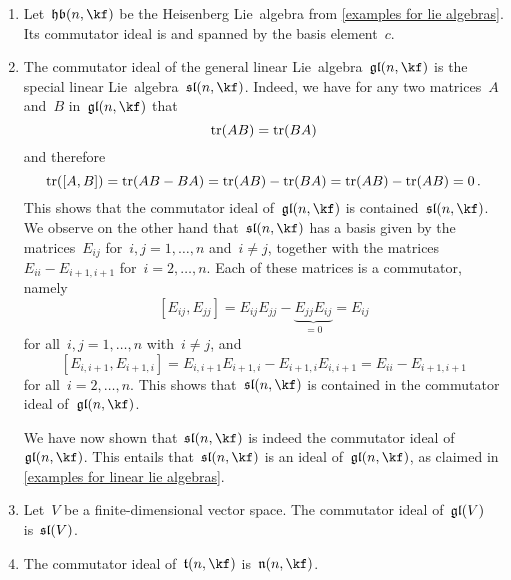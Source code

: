 \begin{example}
	\label{examples of commutator ideals}
	\leavevmode
	\begin{enumerate}
		\item
			Let~$\heisenberglie(n, \kf)$ be the Heisenberg Lie~algebra from \cref{examples for lie algebras}.
			Its commutator ideal is {\onedimensional} and spanned by the basis element~$c$.
		\item
			The commutator ideal of the general linear Lie~algebra~$\gllie(n, \kf)$ is the special linear Lie~algebra~$\sllie(n, \kf)$.
			Indeed, we have for any two matrices~$A$ and~$B$ in~$\gllie(n, \kf)$ that
			\[
				\operatorname{tr}(AB) = \operatorname{tr}(BA)
			\]
			and therefore
			\[
					\operatorname{tr}( [A,B] )
				= \operatorname{tr}(AB-BA)
				= \operatorname{tr}(AB) - \operatorname{tr}(BA)
				= \operatorname{tr}(AB) - \operatorname{tr}(AB)
				= 0  \,.
			\]
			This shows that the commutator ideal of~$\gllie(n, \kf)$ is contained~$\sllie(n, \kf)$.
			We observe on the other hand that~$\sllie(n, \kf)$ has a basis given by the matrices~$E_{ij}$ for~$i,j = 1, \dotsc, n$ and~$i \neq j$, together with the matrices~$E_{ii} - E_{i+1,i+1}$ for~$i = 2, \dotsc, n$.
			Each of these matrices is a commutator, namely
			\[
				[E_{ij}, E_{jj}]
				=
				E_{ij} E_{jj} - \underbrace{ E_{jj} E_{ij} }_{=0}
				=
				E_{ij}
			\]
			for all~$i, j = 1, \dotsc, n$ with~$i \neq j$, and
			\[
				[E_{i,i+1}, E_{i+1,i}]
				=
				E_{i,i+1} E_{i+1,i} - E_{i+1,i} E_{i,i+1}
				=
				E_{ii} - E_{i+1,i+1}
			\]
			for all~$i = 2, \dotsc, n$.
			This shows that~$\sllie(n, \kf)$ is contained in the commutator ideal of~$\gllie(n, \kf)$.

			We have now shown that~$\sllie(n, \kf)$ is indeed the commutator ideal of~$\gllie(n, \kf)$.
			This entails that~$\sllie(n, \kf)$ is an ideal of~$\gllie(n, \kf)$, as claimed in \cref{examples for linear lie algebras}.
		\item
			Let~$V$ be a finite-dimensional vector space.
			The commutator ideal of~$\mathfrak{gl}(V)$ is~$\mathfrak{sl}(V)$.
		\item
			The commutator ideal of~$\trianglie(n, \kf)$ is~$\upperlie(n, \kf)$.
		

\end{enumerate}
\end{example}
